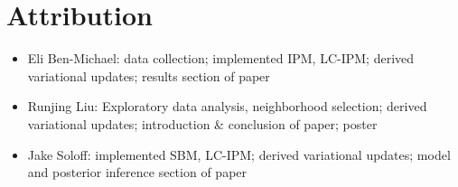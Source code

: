 \documentclass{article}
\begin{document}
\newpage 

\section{Attribution}
\begin{itemize} 
\item Eli Ben-Michael: data collection; implemented IPM, LC-IPM; derived variational updates; results section of paper
\item Runjing Liu: Exploratory data analysis, neighborhood selection; derived variational updates; introduction \& conclusion of paper; poster
\item Jake Soloff: implemented SBM, LC-IPM; derived variational updates; model and posterior inference section of paper
\end{itemize}
\end{document}
